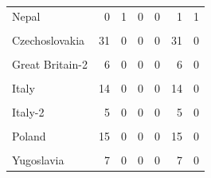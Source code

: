 \documentclass[
]{article}
\begin{document}
\begin{table}[H]
\begin{tabular}[t]{lrrrrrr}
\addlinespace
Nepal & 0 & 1 & 0 & 0 & 1 & 1\\
\cellcolor{gray!10}{Belgium} & \cellcolor{gray!10}{27} & \cellcolor{gray!10}{0} & \cellcolor{gray!10}{0} & \cellcolor{gray!10}{0} & \cellcolor{gray!10}{27} & \cellcolor{gray!10}{0}\\
Czechoslovakia & 31 & 0 & 0 & 0 & 31 & 0\\
\cellcolor{gray!10}{France-2} & \cellcolor{gray!10}{6} & \cellcolor{gray!10}{0} & \cellcolor{gray!10}{0} & \cellcolor{gray!10}{0} & \cellcolor{gray!10}{6} & \cellcolor{gray!10}{0}\\
Great Britain-2 & 6 & 0 & 0 & 0 & 6 & 0\\
\addlinespace
\cellcolor{gray!10}{Hungary} & \cellcolor{gray!10}{6} & \cellcolor{gray!10}{0} & \cellcolor{gray!10}{0} & \cellcolor{gray!10}{0} & \cellcolor{gray!10}{6} & \cellcolor{gray!10}{0}\\
Italy & 14 & 0 & 0 & 0 & 14 & 0\\
\cellcolor{gray!10}{Italy-1} & \cellcolor{gray!10}{5} & \cellcolor{gray!10}{0} & \cellcolor{gray!10}{0} & \cellcolor{gray!10}{0} & \cellcolor{gray!10}{5} & \cellcolor{gray!10}{0}\\
Italy-2 & 5 & 0 & 0 & 0 & 5 & 0\\
\cellcolor{gray!10}{Latvia} & \cellcolor{gray!10}{7} & \cellcolor{gray!10}{0} & \cellcolor{gray!10}{0} & \cellcolor{gray!10}{0} & \cellcolor{gray!10}{7} & \cellcolor{gray!10}{0}\\
\addlinespace
Poland & 15 & 0 & 0 & 0 & 15 & 0\\
\cellcolor{gray!10}{Switzerland-2} & \cellcolor{gray!10}{4} & \cellcolor{gray!10}{0} & \cellcolor{gray!10}{0} & \cellcolor{gray!10}{0} & \cellcolor{gray!10}{4} & \cellcolor{gray!10}{0}\\
Yugoslavia & 7 & 0 & 0 & 0 & 7 & 0\\
\bottomrule
\end{tabular}
\end{table}
\end{document}
